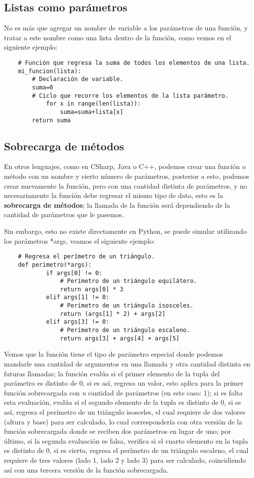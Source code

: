 \subsection{Listas como parámetros}
\hspace{0.55cm}No es más que agregar un nombre de variable a los parámetros de una función, y tratar a este nombre como una lista dentro de la función, como vemos en el siguiente ejemplo:
\begin{lstlisting}
	# Función que regresa la suma de todos los elementos de una lista.
	mi_funcion(lista):
		# Declaración de variable.
		suma=0
		# Ciclo que recorre los elementos de la lista parámetro.
    		for x in range(len(lista)):
        		suma=suma+lista[x]
   		return suma
\end{lstlisting}


\subsection{Sobrecarga de métodos}
\hspace{0.55cm}En otros lenguajes, como en CSharp, Java o C++, podemos crear una función o método con un nombre y cierto número de parámetros, posterior a esto, podemos crear nuevamente la función, pero con una cantidad distinta de parámetros, y no necesariamente la función debe regresar el mismo tipo de dato, esto es la \textbf{sobrecarga de métodos}; la llamada de la función será dependiendo de la cantidad de parámetros que le pasemos.

Sin embargo, esto no existe directamente en Python, se puede simular utilizando los parámetros *args, veamos el siguiente ejemplo:
\begin{lstlisting}
	# Regresa el perímetro de un triángulo.
	def perimetro(*args):
    		if args[0] != 0:
    			# Perímetro de un triángulo equilátero.
        		return args[0] * 3
    		elif args[1] != 0:
    			# Perímetro de un triángulo isosceles.
        		return (args[1] * 2) + args[2]
    		elif args[3] != 0:
    			# Perímetro de un triángulo escaleno.
        		return args[3] + args[4] + args[5]
\end{lstlisting}

Vemos que la función tiene el tipo de parámetro especial donde podemos mandarle una cantidad de argumentos en una llamada y otra cantidad distinta en futuras llamadas; la función evalúa si el primer elemento de la tupla del parámetro es distinto de 0, si es así, regresa un valor, esto aplica para la primer función sobrecargada con \textit{n} cantidad de parámetros (en este caso: 1); si es falta esta evaluación, evalúa si el segundo elemento de la tupla es distinto de 0, si es así, regresa el perímetro de un triángulo isosceles, el cual requiere de dos valores (altura y base) para ser calculado, lo cual correspondería con otra versión de la función sobrecargada donde se reciben dos parámetros en lugar de uno; por último, si la segunda evaluación es falsa, verifica si el cuarto elemento en la tupla es distinto de 0, si es cierto, regresa el perímetro de un triángulo escaleno, el cual requiere de tres valores (lado 1, lado 2 y lado 3) para ser calculado, coincidiendo así con una tercera versión de la función sobrecargada.

